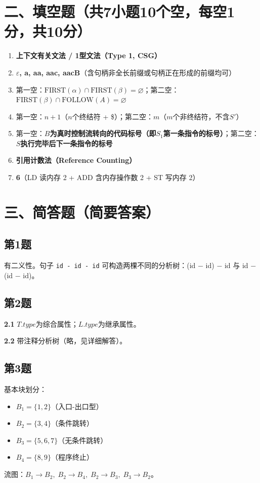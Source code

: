 \documentclass[12pt,a4paper,fontset=fandol]{ctexart}
\begin{document}
\section*{二、填空题（共7小题10个空，每空1分，共10分）}

\begin{enumerate}[label=\arabic*.]
    \item \textbf{上下文有关文法 / 1型文法（Type 1, CSG）}
    \item \textbf{$\varepsilon$,\; a,\; aa,\; aac,\; aacB}（含句柄非全长前缀或句柄正在形成的前缀均可）
    \item 第一空：\textbf{$\text{FIRST}(\alpha) \cap \text{FIRST}(\beta) = \varnothing$}；第二空：\textbf{$\text{FIRST}(\beta) \cap \text{FOLLOW}(A) = \varnothing$}
    \item 第一空：\textbf{$n+1$}（$n$个终结符 + \$）；第二空：\textbf{$m$}（$m$个非终结符，不含$S'$）
    \item 第一空：\textbf{$B$为真时控制流转向的代码标号（即$S_1$第一条指令的标号）}；第二空：\textbf{$S$执行完毕后下一条指令的标号}
    \item \textbf{引用计数法（Reference Counting）}
    \item \textbf{6}（LD 读内存 2 + ADD 含内存操作数 2 + ST 写内存 2）
\end{enumerate}

\section*{三、简答题（简要答案）}

\subsection*{第1题}
有二义性。句子 \texttt{id - id - id} 可构造两棵不同的分析树：(id $-$ id) $-$ id 与 id $-$ (id $-$ id)。

\subsection*{第2题}
\textbf{2.1} $T.\textit{type}$为综合属性；$L.\textit{type}$为继承属性。

\textbf{2.2} 带注释分析树（略，见详细解答）。

\subsection*{第3题}
基本块划分：
\begin{itemize}
    \item $B_1 = \{1, 2\}$（入口-出口型）
    \item $B_2 = \{3, 4\}$（条件跳转）
    \item $B_3 = \{5, 6, 7\}$（无条件跳转）
    \item $B_4 = \{8, 9\}$（程序终止）
\end{itemize}
流图：$B_1 \to B_2,\; B_2 \to B_4,\; B_2 \to B_3,\; B_3 \to B_2$。
\end{document}
